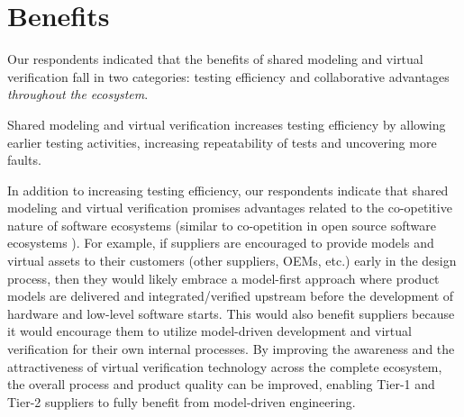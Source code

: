 \section{Benefits} \label{sec:benefits}
Our respondents indicated that the benefits of shared modeling and virtual verification fall in two categories:
testing efficiency and collaborative advantages \emph{throughout the ecosystem}.

Shared modeling and virtual verification increases testing efficiency by allowing earlier testing activities, increasing repeatability of tests and uncovering more faults. 


In addition to increasing testing efficiency, our respondents indicate that shared modeling and virtual verification promises advantages related to the co-opetitive nature of software ecosystems (similar to co-opetition in open source software ecosystems \cite{Agerfalk2008}).
%
%
For example, if suppliers are encouraged to provide models and virtual assets to their customers (other suppliers, OEMs, etc.) early in the design process,
then they would likely embrace a model-first
approach where product models are delivered and integrated/verified upstream before the development of hardware and low-level software starts.
This would also benefit suppliers because it would encourage them to utilize model-driven development and virtual verification for their own internal processes.
By improving the awareness and the attractiveness of virtual verification technology across the complete ecosystem, the overall process and product quality can be improved, enabling Tier-1 and Tier-2 suppliers to fully benefit from model-driven engineering.

